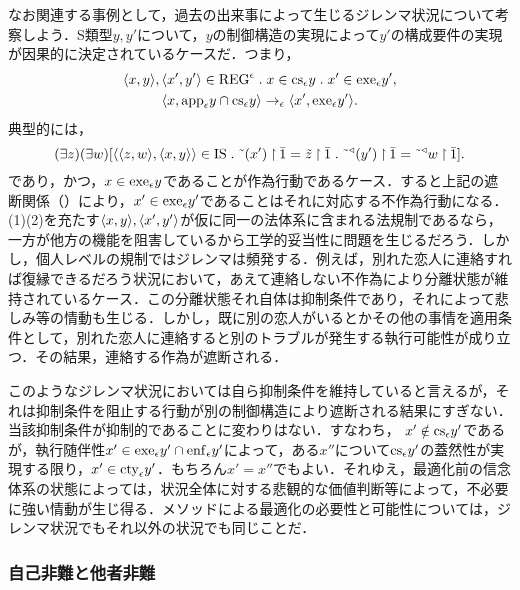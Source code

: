 なお関連する事例として，過去の出来事によって生じるジレンマ状況について考察しよう．S類型$ y,y' $について，$y$の制御構造の実現によって$y'$の構成要件の実現が因果的に決定されているケースだ．つまり，
\setcounter{equation}{0}
\begin{gather}
    \orp{x,y},\orp{x',y'}\in\mathrm{REG}^\epsilon\con{1}x\in\cs{\epsilon}y\con{1}x'\in \exe{\epsilon}y',\\
    \orp{x,\app{\epsilon}y\cap\cs{\epsilon}y}\to_{\epsilon}\orp{x',\exe{\epsilon}y'}.
\end{gather}
典型的には，
\[
    (\exists z)(\exists w)[
        \orp{\orp{z,w},\orp{x,y}}\in\mathrm{IS}\con{1}
        \tildel{(x')}\uphr\bar{1}=\tilde{z}\uphr\bar{1}\con{1}\tildel{\trgl{(y')}}\uphr\bar{1}=\tildel{\trgl{w}}\uphr\bar{1}
    ].
\]
であり，かつ，$ x\in \mathrm{exe}_{\epsilon}y $であることが作為行動であるケース．すると上記の遮断関係（）により，$ x'\in \mathrm{exe}_{\epsilon}y' $であることはそれに対応する不作為行動になる．
(1)(2)を充たす$ \langle x,y \rangle,\langle x',y' \rangle $が仮に同一の法体系に含まれる法規制であるなら，一方が他方の機能を阻害しているから工学的妥当性に問題を生じるだろう．しかし，個人レベルの規制ではジレンマは頻発する．例えば，別れた恋人に連絡すれば復縁できるだろう状況において，あえて連絡しない不作為により分離状態が維持されているケース．この分離状態それ自体は抑制条件であり，それによって悲しみ等の情動も生じる．しかし，既に別の恋人がいるとかその他の事情を適用条件として，別れた恋人に連絡すると別のトラブルが発生する執行可能性が成り立つ．その結果，連絡する作為が遮断される．

このようなジレンマ状況においては自ら抑制条件を維持していると言えるが，それは抑制条件を阻止する行動が別の制御構造により遮断される結果にすぎない．当該抑制条件が抑制的であることに変わりはない．すなわち，
$ x'\notin\mathrm{cs}_{\epsilon}y' $であるが，執行随伴性$ x'\in\mathrm{exe}_{\epsilon}y'\cap\mathrm{enf}_{\epsilon}y' $によって，ある$ x'' $について$ \mathrm{cs}_{\epsilon}y' $の蓋然性が実現する限り，$ x'\in\mathrm{cty}_{\epsilon}y' $．もちろん$ x' = x'' $でもよい．それゆえ，最適化前の信念体系の状態によっては，状況全体に対する悲観的な価値判断等によって，不必要に強い情動が生じ得る．メソッドによる最適化の必要性と可能性については，ジレンマ状況でもそれ以外の状況でも同じことだ．

\subsubsection{自己非難と他者非難}
\label{sssec:自己非難と他者非難}

